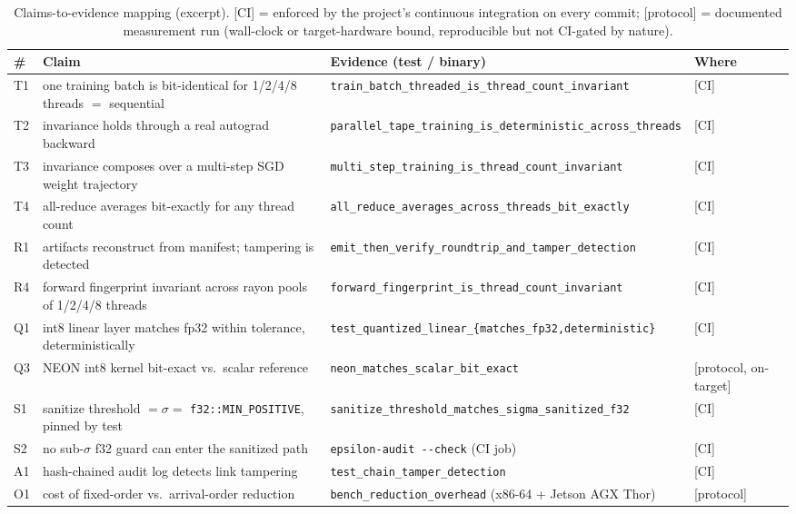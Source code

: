 \documentclass[sigconf,review]{acmart}
\begin{document}
\begin{table}
\caption{Claims-to-evidence mapping (excerpt). [CI] = enforced by the
project's continuous integration on every commit; [protocol] = documented
measurement run (wall-clock or target-hardware bound, reproducible but not
CI-gated by nature).}
\label{tab:claims}
\small
\begin{tabular}{llll}
\toprule
\# & Claim & Evidence (test / binary) & Where \\
\midrule
T1 & one training batch is bit-identical for 1/2/4/8 threads $=$ sequential &
\texttt{train\_batch\_threaded\_is\_thread\_count\_invariant} & [CI] \\
T2 & invariance holds through a real autograd backward &
\texttt{parallel\_tape\_training\_is\_deterministic\_across\_threads} & [CI] \\
T3 & invariance composes over a multi-step SGD weight trajectory &
\texttt{multi\_step\_training\_is\_thread\_count\_invariant} & [CI] \\
T4 & all-reduce averages bit-exactly for any thread count &
\texttt{all\_reduce\_averages\_across\_threads\_bit\_exactly} & [CI] \\
R1 & artifacts reconstruct from manifest; tampering is detected &
\texttt{emit\_then\_verify\_roundtrip\_and\_tamper\_detection} & [CI] \\
R4 & forward fingerprint invariant across rayon pools of 1/2/4/8 threads &
\texttt{forward\_fingerprint\_is\_thread\_count\_invariant} & [CI] \\
Q1 & int8 linear layer matches fp32 within tolerance, deterministically &
\texttt{test\_quantized\_linear\_\{matches\_fp32,deterministic\}} & [CI] \\
Q3 & NEON int8 kernel bit-exact vs.\ scalar reference &
\texttt{neon\_matches\_scalar\_bit\_exact} & [protocol, on-target] \\
S1 & sanitize threshold $=\sigma=$ \texttt{f32::MIN\_POSITIVE}, pinned by test &
\texttt{sanitize\_threshold\_matches\_sigma\_sanitized\_f32} & [CI] \\
S2 & no sub-$\sigma$ f32 guard can enter the sanitized path &
\texttt{epsilon-audit -{}-check} (CI job) & [CI] \\
A1 & hash-chained audit log detects link tampering &
\texttt{test\_chain\_tamper\_detection} & [CI] \\
O1 & cost of fixed-order vs.\ arrival-order reduction &
\texttt{bench\_reduction\_overhead} (x86-64 + Jetson AGX Thor) & [protocol] \\
\bottomrule
\end{tabular}
\end{table}
\end{document}
